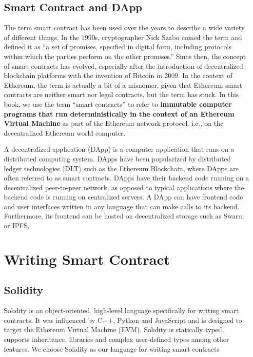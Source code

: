\documentclass{article}
\begin{document}
\subsection{Smart Contract and DApp}
The term smart contract has been used over the years to describe a wide variety of different things. In the 1990s, cryptographer Nick Szabo coined the term and defined it as “a set of promises, specified in digital form, including protocols within which the parties perform on the other promises.” Since then, the concept of smart contracts has evolved, especially after the introduction of decentralized blockchain platforms with the invention of Bitcoin in 2009. In the context of Ethereum, the term is actually a bit of a misnomer, given that Ethereum smart contracts are neither smart nor legal contracts, but the term has stuck. In this book, we use the term “smart contracts” to refer to \textbf{immutable computer programs that run deterministically in the context of an Ethereum Virtual Machine} as part of the Ethereum network protocol. i.e., on the decentralized Ethereum world computer.

A decentralized application (DApp) is a computer application that runs on a distributed computing system. DApps have been popularized by distributed ledger technologies (DLT) such as the Ethereum Blockchain, where DApps are often referred to as smart contracts. DApps have their backend code running on a decentralized peer-to-peer network, as opposed to typical applications where the backend code is running on centralized servers. A DApp can have frontend code and user interfaces written in any language that can make calls to its backend. Furthermore, its frontend can be hosted on decentralized storage such as Swarm or IPFS.

\section{Writing Smart Contract}
\subsection{Solidity}
Solidity is an object-oriented, high-level language specifically for writing smart contracts. It was influenced by C++, Python and JavaScript and is designed to target the Ethereum Virtual Machine (EVM). Solidity is statically typed, supports inheritance, libraries and complex user-defined types among other features. We choose Solidity as our language for writing smart contracts 
\end{document}
